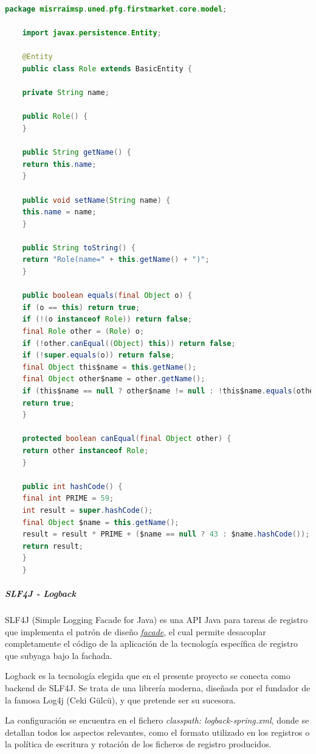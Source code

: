 \documentclass[a4paper]{article}
\begin{document}
    \begin{lstlisting}[language=Java,caption=Clase \emph{Role} tras efectuar un \emph{Delombok},label=list:lombok_open]
    package misrraimsp.uned.pfg.firstmarket.core.model;
    
    import javax.persistence.Entity;
    
    @Entity
    public class Role extends BasicEntity {
    
    private String name;
    
    public Role() {
    }
    
    public String getName() {
    return this.name;
    }
    
    public void setName(String name) {
    this.name = name;
    }
    
    public String toString() {
    return "Role(name=" + this.getName() + ")";
    }
    
    public boolean equals(final Object o) {
    if (o == this) return true;
    if (!(o instanceof Role)) return false;
    final Role other = (Role) o;
    if (!other.canEqual((Object) this)) return false;
    if (!super.equals(o)) return false;
    final Object this$name = this.getName();
    final Object other$name = other.getName();
    if (this$name == null ? other$name != null : !this$name.equals(other$name)) return false;
    return true;
    }
    
    protected boolean canEqual(final Object other) {
    return other instanceof Role;
    }
    
    public int hashCode() {
    final int PRIME = 59;
    int result = super.hashCode();
    final Object $name = this.getName();
    result = result * PRIME + ($name == null ? 43 : $name.hashCode());
    return result;
    }
    }
    \end{lstlisting}
    
    \subparagraph{SLF4J - Logback}
    SLF4J (Simple Logging Facade for Java) es una API Java para tareas de registro que implementa el patrón de diseño \href{https://en.wikipedia.org/wiki/Facade_pattern}{\emph{facade}}, el cual permite desacoplar completamente el código de la aplicación de la tecnología específica de registro que subyaga bajo la fachada.
    
    Logback es la tecnología elegida que en el presente proyecto se conecta como backend de SLF4J. Se trata de una librería moderna, diseñada por el fundador de la famosa Log4j (Ceki Gülcü), y que pretende ser su sucesora.
    
    La configuración se encuentra en el fichero \emph{classpath: logback-spring.xml}, donde se detallan todos los aspectos relevantes, como el formato utilizado en los registros o la política de escritura y rotación de los ficheros de registro producidos.
    
\end{document}
